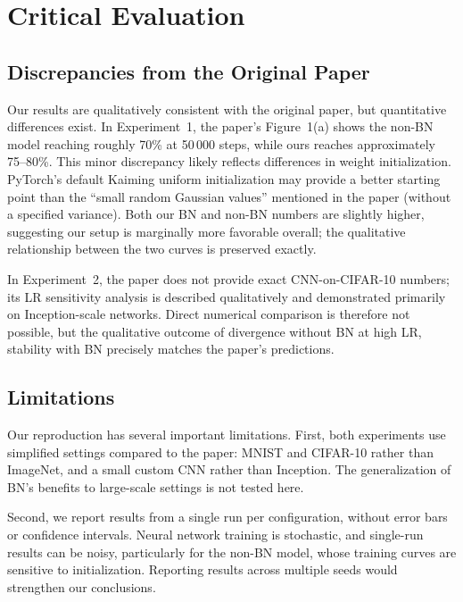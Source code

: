 \documentclass{article}
\begin{document}
\section{Critical Evaluation}

\subsection{Discrepancies from the Original Paper}

Our results are qualitatively consistent with the original paper, but quantitative differences
exist. In Experiment~1, the paper's Figure~1(a) shows the non-BN model reaching roughly 70\%
at 50\,000 steps, while ours reaches approximately 75--80\%. This minor discrepancy likely
reflects differences in weight initialization. PyTorch's default Kaiming uniform
initialization may provide a better starting point than the ``small random Gaussian values''
mentioned in the paper (without a specified variance). Both our BN and non-BN numbers are
slightly higher, suggesting our setup is marginally more favorable overall; the qualitative
relationship between the two curves is preserved exactly.

In Experiment~2, the paper does not provide exact CNN-on-CIFAR-10 numbers; its LR sensitivity
analysis is described qualitatively and demonstrated primarily on Inception-scale networks.
Direct numerical comparison is therefore not possible, but the qualitative outcome of divergence
without BN at high LR, stability with BN precisely matches the paper's predictions.

\subsection{Limitations}

Our reproduction has several important limitations. First, both experiments use simplified
settings compared to the paper: MNIST and CIFAR-10 rather than ImageNet, and a small custom
CNN rather than Inception. The generalization of BN's benefits to large-scale settings is not
tested here.

Second, we report results from a single run per configuration, without error bars or confidence
intervals. Neural network training is stochastic, and single-run results can be noisy,
particularly for the non-BN model, whose training curves are sensitive to initialization.
Reporting results across multiple seeds would strengthen our conclusions.
\end{document}
